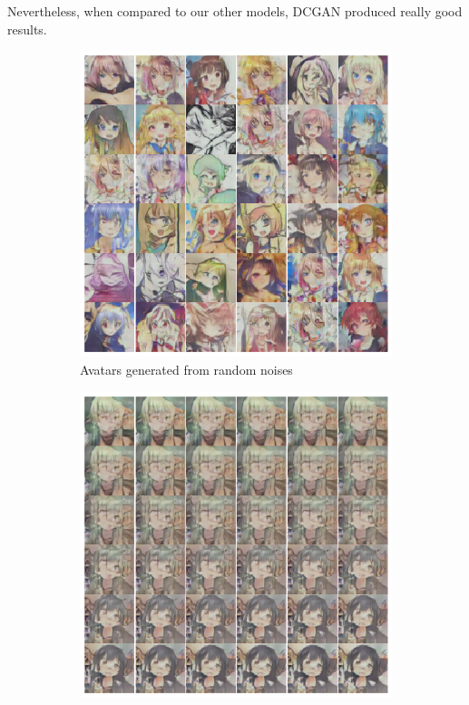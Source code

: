 \documentclass[10pt,twocolumn,letterpaper]{article}
\begin{document}
Nevertheless, when compared to our other models, DCGAN produced really good
results.

\begin{figure}[htb]
   \centering
   \begin{subfigure}{.48\linewidth}
      \centering
      \includegraphics[width=\linewidth]{dcgan-result-random}
      \caption{Avatars generated from random noises}
   \end{subfigure}
   \begin{subfigure}{.48\linewidth}
      \centering
      \includegraphics[width=\linewidth]{dcgan-result-transition}

\end{subfigure}
\end{figure}
\end{document}
